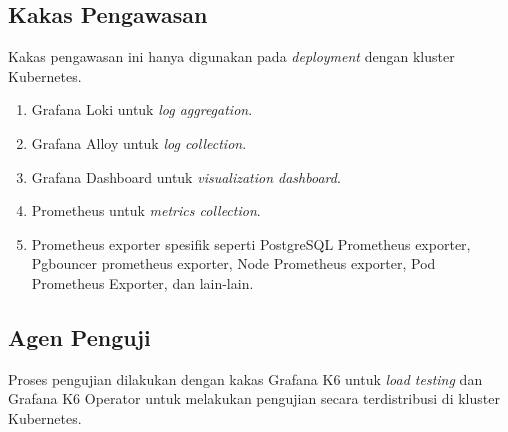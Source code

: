 \subsection{Kakas Pengawasan}

Kakas pengawasan ini hanya digunakan pada \textit{deployment} dengan kluster Kubernetes.

\begin{enumerate}
    \item Grafana Loki untuk \textit{log aggregation}.
    \item Grafana Alloy untuk \textit{log collection}.
    \item Grafana Dashboard untuk \textit{visualization dashboard}.
    \item Prometheus untuk \textit{metrics collection}.
    \item Prometheus exporter spesifik seperti PostgreSQL Prometheus exporter, Pgbouncer prometheus exporter, Node Prometheus exporter, Pod Prometheus Exporter, dan lain-lain.
\end{enumerate}

\subsection{Agen Penguji}

Proses pengujian dilakukan dengan kakas Grafana K6 untuk \textit{load testing} dan Grafana K6 Operator untuk melakukan pengujian secara terdistribusi di kluster Kubernetes.

